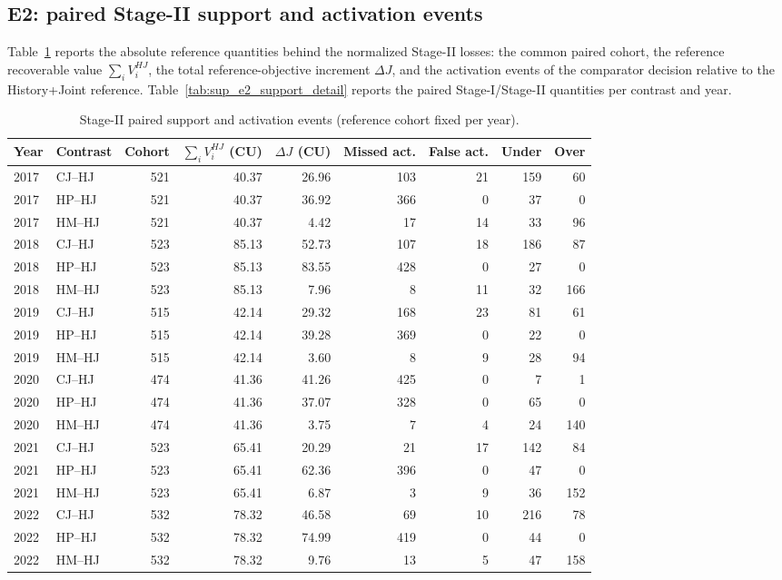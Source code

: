 \documentclass[10pt,a4paper]{article}
\numberwithin{equation}{section}
\begin{document}
\subsection{E2: paired Stage-II support and activation events}
Table~\ref{tab:sup_e2_support} reports the absolute reference quantities behind the normalized Stage-II losses: the common paired cohort, the reference recoverable value $\sum_i V^{HJ}_i$, the total reference-objective increment $\Delta J$, and the activation events of the comparator decision relative to the History+Joint reference. Table~\ref{tab:sup_e2_support_detail} reports the paired Stage-I/Stage-II quantities per contrast and year.
\begin{table}[htbp]\centering\scriptsize
\caption{Stage-II paired support and activation events (reference cohort fixed per year).}\label{tab:sup_e2_support}
\begin{tabular}{llrrrrrrr}\toprule
Year & Contrast & Cohort & $\sum_i V^{HJ}_i$ (CU) & $\Delta J$ (CU) & Missed act. & False act. & Under & Over \\ \midrule
2017 & CJ--HJ & 521 & 40.37 & 26.96 & 103 & 21 & 159 & 60 \\
2017 & HP--HJ & 521 & 40.37 & 36.92 & 366 & 0 & 37 & 0 \\
2017 & HM--HJ & 521 & 40.37 & 4.42 & 17 & 14 & 33 & 96 \\
2018 & CJ--HJ & 523 & 85.13 & 52.73 & 107 & 18 & 186 & 87 \\
2018 & HP--HJ & 523 & 85.13 & 83.55 & 428 & 0 & 27 & 0 \\
2018 & HM--HJ & 523 & 85.13 & 7.96 & 8 & 11 & 32 & 166 \\
2019 & CJ--HJ & 515 & 42.14 & 29.32 & 168 & 23 & 81 & 61 \\
2019 & HP--HJ & 515 & 42.14 & 39.28 & 369 & 0 & 22 & 0 \\
2019 & HM--HJ & 515 & 42.14 & 3.60 & 8 & 9 & 28 & 94 \\
2020 & CJ--HJ & 474 & 41.36 & 41.26 & 425 & 0 & 7 & 1 \\
2020 & HP--HJ & 474 & 41.36 & 37.07 & 328 & 0 & 65 & 0 \\
2020 & HM--HJ & 474 & 41.36 & 3.75 & 7 & 4 & 24 & 140 \\
2021 & CJ--HJ & 523 & 65.41 & 20.29 & 21 & 17 & 142 & 84 \\
2021 & HP--HJ & 523 & 65.41 & 62.36 & 396 & 0 & 47 & 0 \\
2021 & HM--HJ & 523 & 65.41 & 6.87 & 3 & 9 & 36 & 152 \\
2022 & CJ--HJ & 532 & 78.32 & 46.58 & 69 & 10 & 216 & 78 \\
2022 & HP--HJ & 532 & 78.32 & 74.99 & 419 & 0 & 44 & 0 \\
2022 & HM--HJ & 532 & 78.32 & 9.76 & 13 & 5 & 47 & 158 \\
\bottomrule
\end{tabular}
\end{table}
\end{document}
